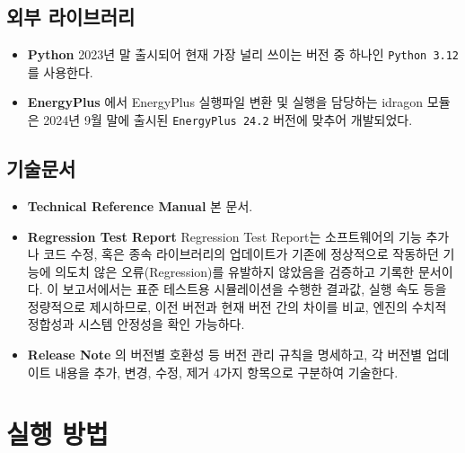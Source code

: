 \section{외부 라이브러리}
\label{section:dirstructure-devenv}

\begin{itemize}
  \item \textbf{Python} \simulator \는 2023년 말 출시되어 현재 가장 널리 쓰이는 버전 중 하나인 \texttt{Python 3.12}\cite{python312}를 사용한다.
  \item \textbf{EnergyPlus} \simulator 에서 EnergyPlus 실행파일 변환 및 실행을 담당하는 idragon 모듈은 2024년 9월 말에 출시된 \texttt{EnergyPlus 24.2}\cite{energyplus242} 버전에 맞추어 개발되었다.
\end{itemize}


\section{기술문서}
\label{section:dirstructure-documentation}

\begin{itemize}
  \item \textbf{Technical Reference Manual} 본 문서.
  \item \textbf{Regression Test Report} Regression Test Report는 소프트웨어의 기능 추가나 코드 수정, 혹은 종속 라이브러리의 업데이트가 기존에 정상적으로 작동하던 기능에 의도치 않은 오류(Regression)를 유발하지 않았음을 검증하고 기록한 문서이다\cite{sommerville2015software}. 이 보고서에서는 표준 테스트용 시뮬레이션을 수행한 결과값, 실행 속도 등을 정량적으로 제시하므로, 이전 버전과 현재 버전 간의 차이를 비교, 엔진의 수치적 정합성과 시스템 안정성을 확인 가능하다.
  \item \textbf{Release Note} \simulator 의 버전별 호환성 등 버전 관리 규칙을 명세하고, 각 버전별 업데이트 내용을 추가, 변경, 수정, 제거 4가지 항목으로 구분하여 기술한다.
\end{itemize}


\chapter{실행 방법}


